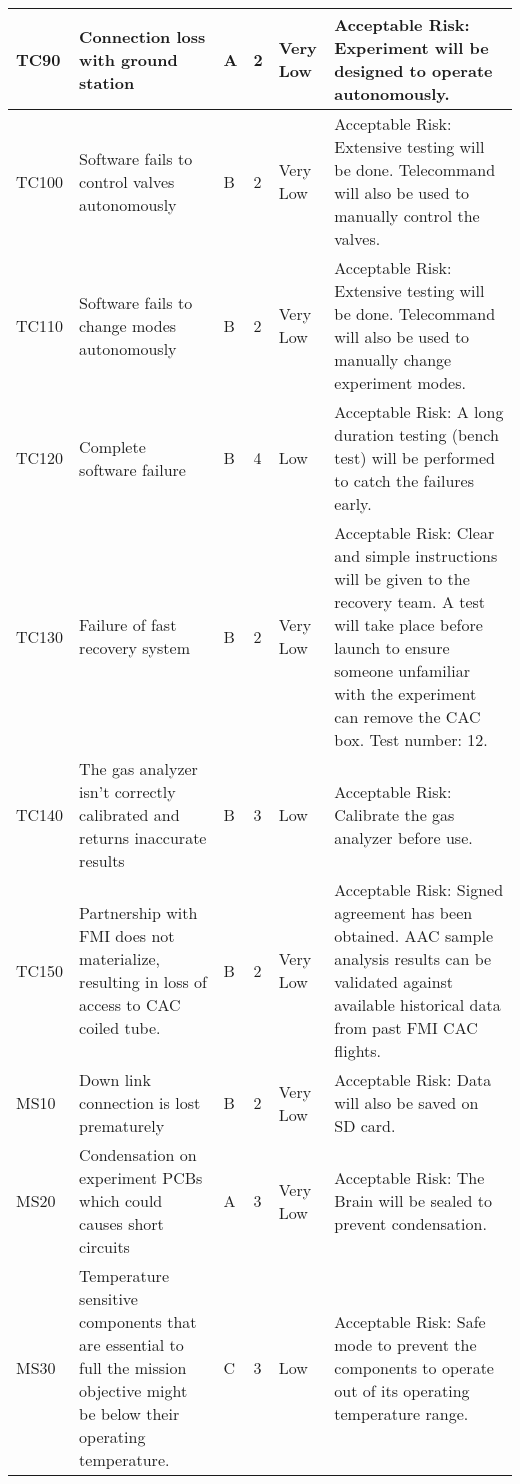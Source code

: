 \begin{longtable}{|m{}| m{} |m{} |m{}|m{}| m{}|}
TC90 & Connection loss with ground station & A & 2 & \cellcolor[HTML]{34FF34}Very Low & Acceptable Risk: Experiment will be designed to operate autonomously. \\ \hline
TC100 & Software fails to control valves autonomously & B & 2 & \cellcolor[HTML]{34FF34}Very Low & Acceptable Risk: Extensive testing will be done. Telecommand will also be used to manually control the valves. \\ \hline
TC110 & Software fails to change modes autonomously & B & 2 & \cellcolor[HTML]{34FF34}Very Low & Acceptable Risk: Extensive testing will be done. Telecommand will also be used to manually change experiment modes. \\ \hline
TC120 & Complete software failure & B & 4 & \cellcolor[HTML]{FCFF2F}Low & Acceptable Risk: A long duration testing (bench test) will be performed to catch the failures early. \\ \hline
TC130 & Failure of fast recovery system & B & 2 & \cellcolor[HTML]{34FF34}Very Low & Acceptable Risk: Clear and simple instructions will be given to the recovery team. A test will take place before launch to ensure someone unfamiliar with the experiment can remove the CAC box. Test number: 12. \\ \hline
TC140 & The gas analyzer isn't correctly calibrated and returns inaccurate results & B & 3 & \cellcolor[HTML]{FCFF2F}Low & Acceptable Risk: Calibrate the gas analyzer before use.\\ \hline 
TC150 & Partnership with FMI does not materialize, resulting in loss of access to CAC coiled tube. & B & 2 & \cellcolor[HTML]{34FF34}Very Low & Acceptable Risk: Signed agreement has been obtained. AAC sample analysis results can be validated against available historical data from past FMI CAC flights. \\ \hline 
MS10 & Down link connection is lost prematurely & B & 2 & \cellcolor[HTML]{34FF34}Very Low & Acceptable Risk: Data will also be saved on SD card. \\ \hline
MS20 & Condensation on experiment PCBs which could causes short circuits & A & 3 & \cellcolor[HTML]{34FF34}Very Low & Acceptable Risk: The Brain will be sealed to prevent condensation. \\ \hline
MS30 & Temperature sensitive components that are essential to full the mission objective might be below their operating temperature. & C & 3 & \cellcolor[HTML]{FCFF2F}Low & Acceptable Risk: Safe mode to prevent the components to operate out of its operating temperature range. \\ \hline

\end{longtable}
